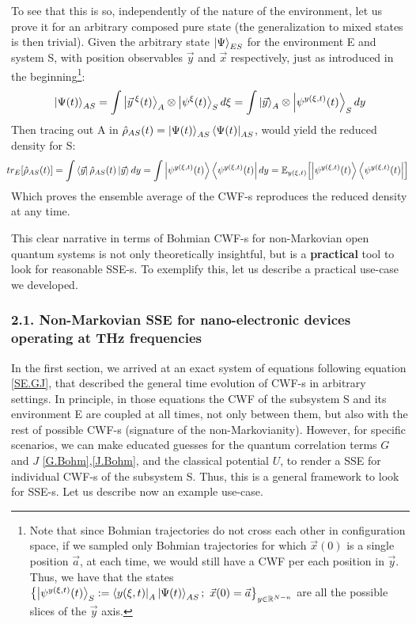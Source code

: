 \documentclass[11pt, a4paper]{article} %
\newcommand{\R}{\mathbb{R}} %
\begin{document}
To see that this is so, independently of the nature of the environment, let us prove it for an arbitrary composed pure state (the generalization to mixed states is then trivial). Given the arbitrary state $\ket{\Psi}_{ES}$ for the environment E and system S, with position observables $\vec{y}$ and $\vec{x}$ respectively, just as introduced in the beginning\footnote{Note that since Bohmian trajectories do not cross each other in configuration space, if we sampled only Bohmian trajectories for which $\vec{x}(0)$ is a single position $\vec{a}$, at each time, we would still have a CWF per each position in $\vec{y}$. Thus, we have that the states $\qty{\ket{\psi^{y(\xi,t)}(t)}_S:=\bra{y(\xi,t)}_A\ket{\Psi(t)}_{AS};\ \vec{x}(0)=\vec{a}}_{y\in\R^{N-n}}$ are all the possible slices of the $\vec{y}$ axis.}:\vspace{-0.2cm}
\begin{equation}
\ket{\Psi(t)}_{AS}=\int\ket{\vec{y}^{\:\xi}(t)}_A\otimes \ket{\psi^\xi(t)}_S d\xi = \int\ket{\vec{y}}_A\otimes \ket{\psi^{y(\xi,t)}(t)}_S dy
\end{equation}
Then tracing out A in $\hat{\rho}_{AS}(t)=\ket{\Psi(t)}_{AS}\bra{\Psi(t)}_{AS}$, would yield the reduced density for S:
\begin{equation}\hspace{-0.2cm}
tr_E\qty[\hat{\rho}_{AS}(t)] = \int\bra{\vec{y}}\hat{\rho}_{AS}(t)\ket{\vec{y}}dy = \int \ket{\psi^{y(\xi,t)}(t)}\bra{\psi^{y(\xi,t)}(t)} dy = \mathbb{E}_{y(\xi,t)}\qty[\ket{\psi^{y(\xi,t)}(t)}\bra{\psi^{y(\xi,t)}(t)}]
\end{equation}
Which proves the ensemble average of the CWF-s reproduces the reduced density at any time.\vspace{-0.15cm}

This clear narrative in terms of Bohmian CWF-s for non-Markovian open quantum systems is not only theoretically insightful, but is a {\bf practical} tool to look for reasonable SSE-s. To exemplify this, let us describe a practical use-case we developed.\vspace{-0.2cm}

\subsubsection*{2.1. Non-Markovian SSE for nano-electronic devices operating at THz frequencies}\vspace{-0.15cm}
In the first section, we arrived at an exact system of equations following equation \eqref{SE.GJ}, that described the general time evolution of CWF-s in arbitrary settings. In principle, in those equations the CWF of the subsystem S and its environment E are coupled at all times, not only between them, but also with the rest of possible CWF-s (signature of the non-Markovianity). However, for specific scenarios, we can make educated guesses for the quantum correlation terms $G$ and $J$ \eqref{G.Bohm},\eqref{J.Bohm}, and the classical potential $U$, to render a SSE for individual CWF-s of the subsystem S. Thus, this is a general framework to look for SSE-s. Let us describe now an example use-case.
\end{document}

